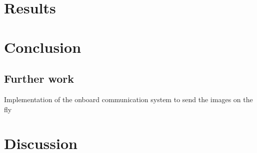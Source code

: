 \section{Results} 
\section{Conclusion}
\subsection{Further work}
Implementation of the onboard communication system to send the images on the fly
\section{Discussion}
\newpage